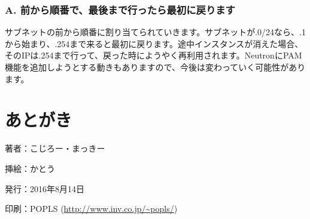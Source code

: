 \documentclass[9pt,b5paper,tombo,openany]{jsbook}
\begin{document}
\subsection*{{\LARGE\bfseries A.} 前から順番で、最後まで行ったら最初に戻ります}
サブネットの前から順番に割り当てられていきます。サブネットが.0/24なら、.1から始まり、.254まで来ると最初に戻ります。途中インスタンスが消えた場合、そのIPは.254まで行って、戻った時にようやく再利用されます。NeutronにPAM機能を追加しようとする動きもありますので、今後は変わっていく可能性があります。

\chapter{あとがき}

\newpage

\thispagestyle{empty}
\begin{flushright}
	\begin{minipage}{0.5\paperwidth}
		\begin{description}
			\item{著者：}こじろー・まっきー
			\item{挿絵：}かとう
			\item{発行：}2016年8月14日
			\item{印刷：}POPLS (\url{http://www.inv.co.jp/~popls/})
		\end{description}
	\end{minipage}
\end{flushright}
\end{document}
